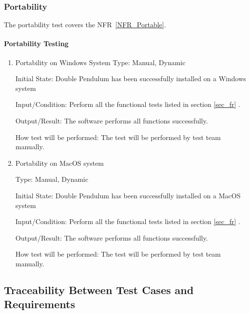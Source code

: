 \documentclass[12pt, titlepage]{article}
\begin{document}
\subsubsection{Portability} \label{PortTest}
The portability test covers the NFR~\ref{NFR_Portable}.

\paragraph{Portability Testing\\}

\begin{enumerate}
\item{Portability on Windows System} 
Type: Manual, Dynamic

Initial State: Double Pendulum has been successfully installed on a Windows system
          
Input/Condition: Perform all the functional tests listed in section \ref{sec_fr} . 
          
Output/Result: The software performs all functions successfully. 

How test will be performed: The test will be performed by test team manually.

\item{Portability on MacOS system}

Type: Manual, Dynamic

Initial State: Dou{}ble Pendulum has been successfully installed on a MacOS system
          
Input/Condition: Perform all the functional tests listed in section \ref{sec_fr} . 
          
Output/Result: The software performs all functions successfully. 
          
How test will be performed: The test will be performed by test team manually.

\end{enumerate}


\subsection{Traceability Between Test Cases and Requirements}
\end{document}
